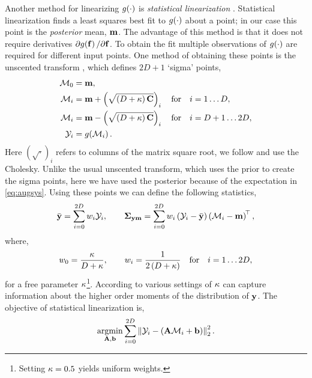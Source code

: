 \documentclass{article} %
\begin{document}
Another method for linearizing $\nonlin{\cdot}$ is \emph{statistical
    linearization} \cite{Geist2010}. Statistical linearization finds a least
squares best fit to $\nonlin{\cdot}$ about a point; in our case this point is
the \emph{posterior} mean, $\pomean$. The advantage of this method is that it
does not require derivatives $\partial\nonlin{\lstate}/\partial\lstate$. To
obtain the fit multiple observations of $\nonlin{\cdot}$ are required for
different input points. One method of obtaining these points is the unscented
transform \cite{Julier2004}, which defines $2D+1$ `sigma' points,
\begin{align}
    \Sfunc_0 &= \pomean,
        \label{eq:spoint0} \\
    \Sfunc_i &= \pomean + \brac{\sqrt{\brac{D + \scoef} \pocov}}_i \quad
        \text{for} \quad i = 1 \ldots D, \\
    \Sfunc_i &= \pomean - \brac{\sqrt{\brac{D + \scoef} \pocov}}_i \quad
        \text{for} \quad i = D+1 \ldots 2D,
        \label{eq:spointi} \\
    \Sobs_i &= \nonlin{\Sfunc_i}.
\end{align}
Here $(\sqrt{\cdot})_i$ refers to columns of the matrix square root, we follow
\cite{Julier2004} and use the Cholesky. Unlike the usual unscented transform,
which uses the prior to create the sigma points, here we have used the
posterior because of the expectation in \eqref{eq:augsys}. Using these points
we can define the following statistics,
\begin{equation}
    \bar\obs = \sum^{2D}_{i=0} \Sw_i \Sobs_i,
    \qquad
    \xcov = \sum^{2D}_{i=0} \Sw_i \brac{\Sobs_i - \bar\obs}
        \brac{\Sfunc_i - \pomean}\transpose,
    \label{eq:slstats}
\end{equation}
where,
\begin{equation}
    \Sw_0 = \frac{\scoef}{D + \scoef},
        \qquad \Sw_i = \frac{1}{2\brac{D + \scoef}}
        \quad \text{for} \quad i = 1 \ldots 2D,
    \label{eq:slweights}
\end{equation}
for a free parameter $\scoef$\footnote{Setting $\scoef = 0.5$ yields
    uniform weights.}. According to \cite{Julier2004} various settings of
$\scoef$ can capture information about the higher order moments of the
distribution of $\obs$. The objective of statistical linearization is,
\begin{equation}
    \argmin_{\Linmat, \intcpt} \sum^{2D}_{i=0} 
        \lnorm{2}{\Sobs_i - \brac{\Linmat\Sfunc_i + \intcpt}}^2.
\end{equation}
\end{document}
